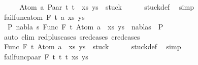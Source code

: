 \begin{isabellebody}
\ \ \isamarkupfalse%
\ \isamarkupfalse%
\ {\isachardoublequoteopen}{\isacharparenleft}{\kern0pt}{\isacharparenleft}{\kern0pt}Atom\ a{\isacharcomma}{\kern0pt}\ Paar\ t{}\ t{}{\isacharparenright}{\kern0pt}\ {\isacharhash}{\kern0pt}\ xs{\isacharcomma}{\kern0pt}\ ys{\isacharparenright}{\kern0pt}\ {\isasymin}\ stuck{\isachardoublequoteclose}\isanewline
\ \ \ \ \isamarkupfalse%
\ stuck{\isacharunderscore}{\kern0pt}def\ \isamarkupfalse%
\ simp\isanewline
{}\isamarkupfalse%
\isanewline
\ \ \isamarkupfalse%
\ {\isacharparenleft}{\kern0pt}fail{\isacharunderscore}{\kern0pt}func{\isacharunderscore}{\kern0pt}atom\ F\ t{}\ a\ xs\ ys{\isacharparenright}{\kern0pt}\isanewline
\ \ \isamarkupfalse%
\ {\isachardoublequoteopen}{\isasymnot}\ {\isacharparenleft}{\kern0pt}{\isasymexists}P{}\ nabla\ s{\isachardot}{\kern0pt}\ {\isacharparenleft}{\kern0pt}{\isacharparenleft}{\kern0pt}Func\ F\ t{}{\isacharcomma}{\kern0pt}\ Atom\ a{\isacharparenright}{\kern0pt}\ {\isacharhash}{\kern0pt}\ xs{\isacharcomma}{\kern0pt}\ ys{\isacharparenright}{\kern0pt}\ {\isasymTurnstile}\ {\isacharparenleft}{\kern0pt}nabla{\isacharcomma}{\kern0pt}s{\isacharparenright}{\kern0pt}\ {\isasymRightarrow}\ P{}{\isacharparenright}{\kern0pt}{\isachardoublequoteclose}\isanewline
\ \ \ \ \isamarkupfalse%
\ {\isacharparenleft}{\kern0pt}auto\ elim{\isacharcolon}{\kern0pt}\ red{\isacharunderscore}{\kern0pt}plus{\isachardot}{\kern0pt}cases\ s{\isacharunderscore}{\kern0pt}red{\isachardot}{\kern0pt}cases\ c{\isacharunderscore}{\kern0pt}red{\isachardot}{\kern0pt}cases{\isacharparenright}{\kern0pt}\isanewline
\ \ \isamarkupfalse%
\ \isamarkupfalse%
\ {\isachardoublequoteopen}{\isacharparenleft}{\kern0pt}{\isacharparenleft}{\kern0pt}Func\ F\ t{}{\isacharcomma}{\kern0pt}\ Atom\ a{\isacharparenright}{\kern0pt}\ {\isacharhash}{\kern0pt}\ xs{\isacharcomma}{\kern0pt}\ ys{\isacharparenright}{\kern0pt}\ {\isasymin}\ stuck{\isachardoublequoteclose}\isanewline
\ \ \ \ \isamarkupfalse%
\ stuck{\isacharunderscore}{\kern0pt}def\ \isamarkupfalse%
\ simp\isanewline
{}\isamarkupfalse%
\isanewline
\ \ \isamarkupfalse%
\ {\isacharparenleft}{\kern0pt}fail{\isacharunderscore}{\kern0pt}func{\isacharunderscore}{\kern0pt}paar\ F\ t\ t{}\ t{}\ xs\ ys{\isacharparenright}{\kern0pt}\isanewline

\end{isabellebody}
